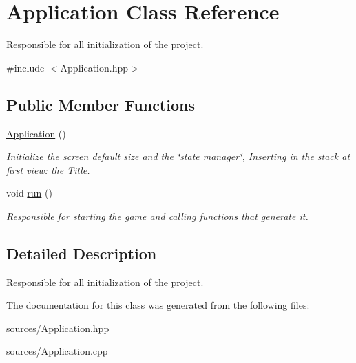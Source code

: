 \hypertarget{classApplication}{}\section{Application Class Reference}
\label{classApplication}


Responsible for all initialization of the project.  




{\ttfamily \#include $<$Application.\+hpp$>$}

\subsection*{Public Member Functions}
\begin{DoxyCompactItemize}
\item 
\mbox{\label{classApplication_afa8cc05ce6b6092be5ecdfdae44e05f8}} 
\hyperlink{classApplication_afa8cc05ce6b6092be5ecdfdae44e05f8}{Application} ()
\begin{DoxyCompactList}\small\item\em Initialize the screen default size and the \char`\"{}state manager\char`\"{}, Inserting in the stack at first view\+: the Title. \end{DoxyCompactList}\item 
\mbox{\label{classApplication_a68965449404743bf1add056784d6cf81}} 
void \hyperlink{classApplication_a68965449404743bf1add056784d6cf81}{run} ()
\begin{DoxyCompactList}\small\item\em Responsible for starting the game and calling functions that generate it. \end{DoxyCompactList}\end{DoxyCompactItemize}


\subsection{Detailed Description}
Responsible for all initialization of the project. 

The documentation for this class was generated from the following files\+:\begin{DoxyCompactItemize}
\item 
sources/Application.\+hpp\item 
sources/Application.\+cpp\end{DoxyCompactItemize}
